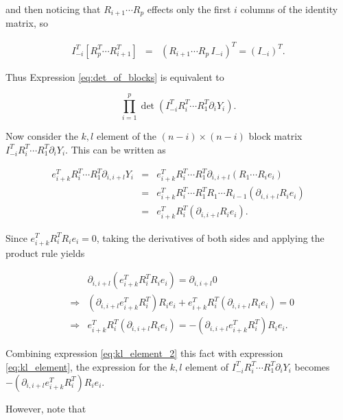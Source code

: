 \documentclass[ba]{imsart}
\numberwithin{equation}{section}
\theoremstyle{plain}
\begin{document}
\noindent and then noticing that $R_{i+1} \cdots R_p$ effects only the first $i$ columns of the identity matrix, so 

\begin{eqnarray}
I_{-i}^T
\left[ R_p^T \cdots R_{i+1}^T\right]  &=& \left( R_{i+1} \cdots R_p\, I_{-i} \right)^T = \left( I_{-i} \right)^T.
\end{eqnarray}

\noindent Thus Expression \ref{eq:det_of_blocks} is equivalent to

\begin{equation}
\label{eq:simplified_determinant}
\prod_{i=1}^p \det \left( I_{-i}^T R_i^T \cdots R_1^T \partial_{i} Y_i \right).
\end{equation}

\noindent Now consider the $k,l$ element of the $(n-i) \times (n-i)$ block matrix $I_{-i}^T R_i^T \cdots R_1^T \partial_{i} Y_i $. This can be written as 

\begin{eqnarray}
\label{eq:kl_element}
e_{i+k}^T R_i^T \cdots R_1^T \partial_{i,i+l} Y_i &=&  e_{i+k}^T R_i^T \cdots R_1^T \partial_{i,i+l} (R_1 \cdots R_i e_i)\nonumber \\ \nonumber
&=&  e_{i+k}^T R_i^T \cdots R_1^T R_1 \cdots R_{i-1} (\partial_{i,i+l} R_i e_i)\nonumber \\ 
&=&  e_{i+k}^T R_i^T  (\partial_{i,i+l} R_i e_i).
\end{eqnarray}

\noindent Since  $e_{i+k}^T R_i^T R_i e_i =0$, taking the derivatives of both sides and applying the product rule yields

\begin{eqnarray}
\label{eq:kl_element_2}
&&\partial_{i,i+l} (e_{i+k}^T R_i^T R_i e_i) = \partial_{i,i+l} 0\nonumber \\
&\Rightarrow& (\partial_{i,i+l} e_{i+k}^T R_i^T) R_i e_i + e_{i+k}^T R_i^T ( \partial_{i,i+l}R_i e_i) = 0\nonumber \\
&\Rightarrow& e_{i+k}^T R_i^T  (\partial_{i,i+l}R_i e_i) = -(\partial_{i,i+l} e_{i+k}^T R_i^T) R_i e_i.
\end{eqnarray}

\noindent Combining expression \ref{eq:kl_element_2} this fact with expression \ref{eq:kl_element}, the expression for the $k,l$ element of $I_{-i}^T R_i^T \cdots R_1^T \partial_{i} Y_i $ becomes $-(\partial_{i,i+l} e_{i+k}^T R_i^T) R_i e_i$.

\noindent However, note that
\end{document}
